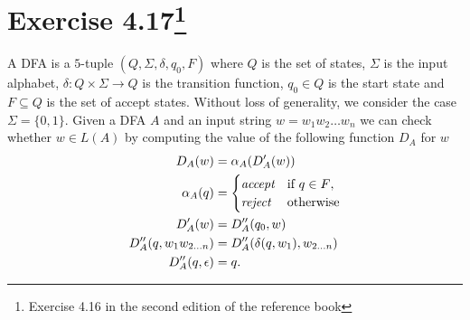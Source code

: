 \section{Exercise 4.17\footnote{Exercise 4.16 in the second edition of the
reference book}}
A DFA is a \(5\)-tuple \((Q,\Sigma,\delta,q_0,F)\) where \(Q\) is the set of
states, \(\Sigma\) is the input alphabet, \(\delta : Q \times \Sigma \to Q\) is the transition
function, \(q_0 \in Q\) is the start state and \(F \subseteq Q\) is the set of
accept states. Without loss of generality, we consider the case \(\Sigma =
\{0,1\}\).
Given a DFA \(A\) and an input string \(w = w_1 w_2 \ldots w_n\) we can check
whether \(w \in L(A)\) by computing the value of the following function \(D_A\)
for \(w\)
\begin{align*}
	D_A(w) &= \alpha_A(D_A'(w))\\
	\alpha_A(q) &= \begin{cases}
		\emph{accept} & \text{if \(q \in F\)},\\
		\emph{reject} & \text{otherwise}
	\end{cases}\\
	D_A'(w) &= D_A''(q_0,w)\\
	D_A''(q,w_1 w_{2 \ldots n}) &= D_A''(\delta(q,w_1),w_{2 \ldots n})\\
	D_A''(q,\epsilon) &= q.
\end{align*}

